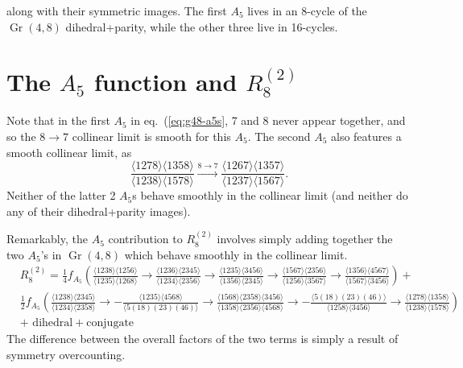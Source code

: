 \documentclass[11pt]{article}
\DeclareMathOperator{\Gr}{Gr}
\def\pdfeq#1{\texorpdfstring{$#1$}{a}}
\begin{document}
along with their symmetric images. The first $A_5$ lives in an 8-cycle of the $\Gr(4,8)$ dihedral+parity, while the other three live in 16-cycles. 

\section{The \pdfeq{A_5} function and \pdfeq{R_8^{(2)}}}

Note that in the first $A_5$ in eq.~(\ref{eq:g48-a5s}, 7 and 8 never appear together, and so the $8\to7$ collinear limit is smooth for this $A_5$. The second $A_5$ also features a smooth collinear limit, as 
\begin{equation}
	\frac{\langle 1278\rangle  \langle 1358\rangle
   }{\langle 1238\rangle  \langle 1578\rangle } \xrightarrow{8\to7} \frac{\langle 1267\rangle  \langle 1357\rangle
   }{\langle 1237\rangle  \langle 1567\rangle }.
\end{equation}
Neither of the latter 2 $A_5$s behave smoothly in the collinear limit (and neither do any of their dihedral+parity images).

Remarkably, the $A_5$ contribution to $R^{(2)}_8$ involves simply adding together the two $A_5$'s in $\Gr(4,8)$ which behave smoothly in the collinear limit. 
\begin{equation}\label{eq:r28A5}
\begin{split}
	&R^{(2)}_8 = \frac14 f_{A_5}\left(\frac{\langle 1238\rangle  \langle 1256\rangle }{\langle
   1235\rangle  \langle 1268\rangle }\to \frac{\langle
   1236\rangle  \langle 2345\rangle }{\langle 1234\rangle
    \langle 2356\rangle }\to \frac{\langle 1235\rangle 
   \langle 3456\rangle }{\langle 1356\rangle  \langle
   2345\rangle }\to \frac{\langle 1567\rangle  \langle
   2356\rangle }{\langle 1256\rangle  \langle 3567\rangle
   }\to \frac{\langle 1356\rangle  \langle 4567\rangle
   }{\langle 1567\rangle  \langle 3456\rangle }\right)+\\
   &\frac12 f_{A_5}\left(\frac{\langle 1238\rangle  \langle 2345\rangle
   }{\langle 1234\rangle  \langle 2358\rangle
   }\to-\frac{\langle 1235\rangle  \langle 4568\rangle
   }{\langle 5(18)(23)(46)\rangle }\to\frac{\langle
   1568\rangle  \langle 2358\rangle  \langle 3456\rangle
   }{\langle 1358\rangle  \langle 2356\rangle  \langle
   4568\rangle }\to-\frac{\langle 5(18)(23)(46)\rangle
   }{\langle 1258\rangle  \langle 3456\rangle
   }\to\frac{\langle 1278\rangle  \langle 1358\rangle
   }{\langle 1238\rangle  \langle 1578\rangle }\right)\\
   &+\text{ dihedral} + \text{conjugate}
\end{split}
\end{equation}
The difference between the overall factors of the two terms is simply a result of symmetry overcounting. 
\end{document}
